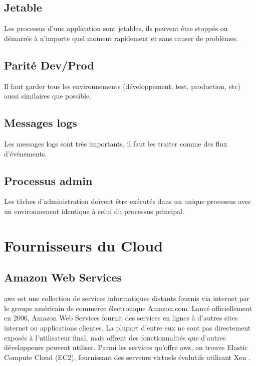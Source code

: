 \section*{Jetable}

Les processus d'une application sont jetables, ils peuvent être stoppés ou démarrés à n'importe quel moment rapidement et sans causer de problèmes.

\section*{Parité Dev/Prod}

Il faut garder tous les environnements (développement, test, production, etc) aussi similaires que possible.

\section*{Messages logs}

Les messages logs sont très importants, il faut les traiter comme des flux d'événements.

\section*{Processus admin}

Les tâches d'administration doivent être exécutés dans un unique processus avec un environnement identique à celui du processus principal. 

\chapter{Fournisseurs du Cloud}

\section*{Amazon Web Services}

\acrshort{aws} est une collection de services informatiques distants fournis via internet par le groupe américain de commerce électronique Amazon.com. Lancé officiellement en 2006, Amazon Web Services fournit des services en lignes à d'autres sites internet ou applications clientes. La plupart d'entre eux ne sont pas directement exposés à l'utilisateur final, mais offrent des fonctionnalités que d'autres développeurs peuvent utiliser. Parmi les services qu'offre \acrshort{aws}, on trouve Elastic Compute Cloud (EC2), fournissant des serveurs virtuels évolutifs utilisant Xen \cite{aws}. 


